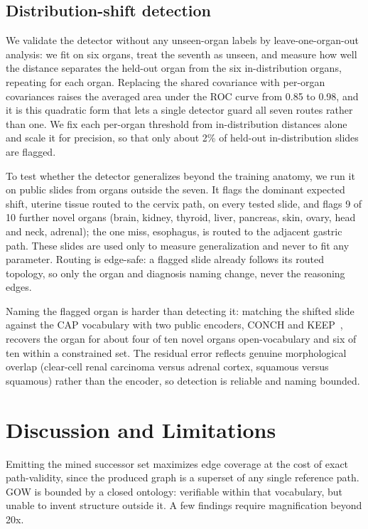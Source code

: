 \documentclass[runningheads]{llncs}
\begin{document}


\subsection{Distribution-shift detection}
We validate the detector without any unseen-organ labels by leave-one-organ-out analysis: we fit on six organs,
treat the seventh as unseen, and measure how well the distance separates the held-out organ from the six
in-distribution organs, repeating for each organ. Replacing the shared covariance with per-organ covariances
raises the averaged area under the ROC curve from 0.85 to 0.98, and it is this quadratic form that lets a single
detector guard all seven routes rather than one. We fix each per-organ threshold from in-distribution distances
alone and scale it for precision, so that only about 2\% of held-out in-distribution slides are flagged.

To test whether the detector generalizes beyond the training anatomy, we run it on public slides from organs
outside the seven. It flags the dominant expected shift, uterine tissue routed to the cervix path, on every
tested slide, and flags 9 of 10 further novel organs (brain, kidney, thyroid, liver, pancreas, skin, ovary, head and neck,
adrenal); the one miss, esophagus, is routed to the adjacent gastric path. These slides are used only to measure generalization and never to fit any parameter. Routing is
edge-safe: a flagged slide already follows its routed topology, so only the organ and diagnosis naming change,
never the reasoning edges.

Naming the flagged organ is harder than detecting it: matching the shifted slide against the CAP vocabulary with
two public encoders, CONCH and KEEP~\cite{keep}, recovers the organ for about four of ten novel organs
open-vocabulary and six of ten within a constrained set. The residual error reflects genuine morphological
overlap (clear-cell renal carcinoma versus adrenal cortex, squamous versus squamous) rather than the encoder, so
detection is reliable and naming bounded.

\section{Discussion and Limitations}
\label{sec:discussion}
Emitting the mined successor set maximizes edge coverage at the cost of exact path-validity, since the produced
graph is a superset of any single reference path. GOW is bounded by a closed ontology: verifiable within that
vocabulary, but unable to invent structure outside it. A few findings require magnification beyond 20x.
\end{document}
